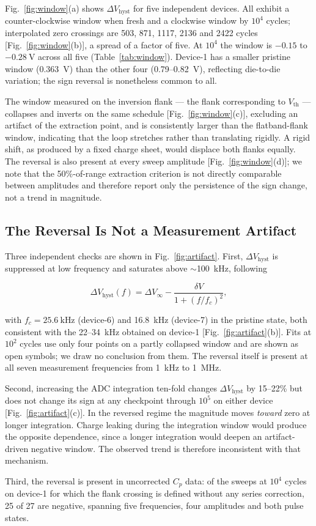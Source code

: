 \documentclass[journal]{IEEEtran}
\newcommand{\rev}[1]{{\color{blue}#1}}      %
\newcommand{\Vth}{V_{\mathrm{th}}}
\newcommand{\dVh}{\Delta V_{\mathrm{hyst}}}
\begin{document}
\rev{Fig.~\ref{fig:window}(a) shows $\dVh$ for five independent devices.
All exhibit a counter-clockwise window when fresh and a clockwise window
by $10^4$ cycles; interpolated zero crossings are 503, 871, 1117, 2136
and 2422 cycles [Fig.~\ref{fig:window}(b)], a spread of a factor of
five. At $10^4$ the window is $-0.15$ to $-\SI{0.28}{\volt}$ across all
five (Table~\ref{tab:window}). Device-1 has a smaller pristine window
(\SI{0.363}{\volt}) than the other four (0.79--\SI{0.82}{\volt}),
reflecting die-to-die variation; the sign reversal is nonetheless common
to all.}

\rev{The window measured on the inversion flank --- the flank
corresponding to $\Vth$ --- collapses and inverts on the same schedule
[Fig.~\ref{fig:window}(c)], excluding an artifact of the extraction
point, and is consistently larger than the flatband-flank window,
indicating that the loop stretches rather than translating rigidly. A
rigid shift, as produced by a fixed charge sheet, would displace both
flanks equally. The reversal is also present at every sweep amplitude
[Fig.~\ref{fig:window}(d)]; we note that the 50\%-of-range extraction
criterion is not directly comparable between amplitudes and therefore
report only the persistence of the sign change, not a trend in
magnitude.}

\rev{\subsection{The Reversal Is Not a Measurement Artifact}
Three independent checks are shown in Fig.~\ref{fig:artifact}. First,
$\dVh$ is suppressed at low frequency and saturates above
$\sim$\SI{100}{\kilo\hertz}, following}
\begin{equation}
\dVh(f) = \Delta V_\infty - \frac{\delta V}{1+(f/f_c)^{2}},
\label{eq:debye}
\end{equation}
\rev{with $f_c=\SI{25.6}{\kilo\hertz}$ (device-6) and
\SI{16.8}{\kilo\hertz} (device-7) in the pristine state, both consistent
with the 22--\SI{34}{\kilo\hertz} obtained on device-1
[Fig.~\ref{fig:artifact}(b)]. Fits at $10^2$ cycles use only four points
on a partly collapsed window and are shown as open symbols; we draw no
conclusion from them. The reversal itself is present at all seven
measurement frequencies from \SI{1}{\kilo\hertz} to \SI{1}{\mega\hertz}.

Second, increasing the ADC integration ten-fold changes $\dVh$ by
15--22\% but does not change its sign at any checkpoint through $10^5$
on either device [Fig.~\ref{fig:artifact}(c)]. In the reversed regime
the magnitude moves \emph{toward} zero at longer integration. Charge
leaking during the integration window would produce the opposite
dependence, since a longer integration would deepen an artifact-driven
negative window. The observed trend is therefore inconsistent with that
mechanism.

Third, the reversal is present in uncorrected $C_p$ data: of the sweeps
at $10^4$ cycles on device-1 for which the flank crossing is defined
without any series correction, 25 of 27 are negative, spanning five
frequencies, four amplitudes and both pulse states.}
\end{document}
